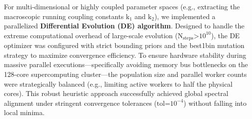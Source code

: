 For multi-dimensional or highly coupled parameter spaces (e.g.,
extracting the macroscopic running coupling constants
\(\text{k}_{\text{1}}\) and \(\text{k}_{\text{2}}\)), we implemented a
parallelized \textbf{Differential Evolution (DE) algorithm}. Designed to
handle the extreme computational overhead of large-scale evolution
(\(\text{N}_{\text{steps}}\text{>}\text{10}^{\text{10}}\)), the DE
optimizer was configured with strict bounding priors and the best1bin
mutation strategy to maximize convergence efficiency. To ensure hardware
stability during massive parallel executions---specifically avoiding
memory bus bottlenecks on the 128-core supercomputing cluster---the
population size and parallel worker counts were strategically balanced
(e.g., limiting active workers to half the physical cores). This robust
heuristic approach successfully achieved global spectral alignment under
stringent convergence tolerances (\(\text{tol=}\text{10}^{\text{−4}}\))
without falling into local minima.
